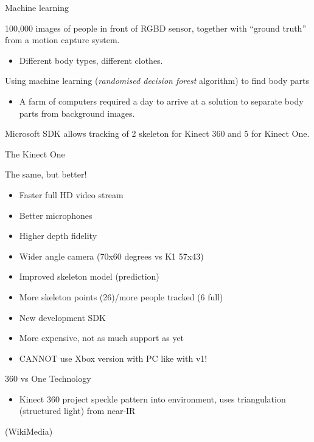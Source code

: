 \documentclass[compress]{beamer}
\begin{document}
\begin{frame}{Machine learning}

100,000 images of people in front of RGBD sensor, together with ``ground
truth'' from a motion capture system.

\begin{itemize}

\item
  Different body types, different clothes.
\end{itemize}

Using machine learning (\emph{randomised decision forest} algorithm) to
find body parts

\begin{itemize}

\item
  A farm of computers required a day to arrive at a solution to separate
  body parts from background images.
\end{itemize}

Microsoft SDK allows tracking of 2 skeleton for Kinect 360 and 5 for
Kinect One.

\end{frame}

\begin{frame}{The Kinect One}

The same, but better!

\begin{itemize}

\item
  Faster full HD video stream
\item
  Better microphones
\item
  Higher depth fidelity
\item
  Wider angle camera (70x60 degrees vs K1 57x43)
\item
  Improved skeleton model (prediction)
\item
  More skeleton points (26)/more people tracked (6 full)
\item
  New development SDK
\item
  More expensive, not as much support as yet
\item
  CANNOT use Xbox version with PC like with v1!
\end{itemize}

\end{frame}

\begin{frame}{360 vs One Technology}

\begin{itemize}

\item
  Kinect 360 project speckle pattern into environment, uses
  triangulation (structured light) from near-IR
\end{itemize}

(WikiMedia)

\end{frame}
\end{document}
